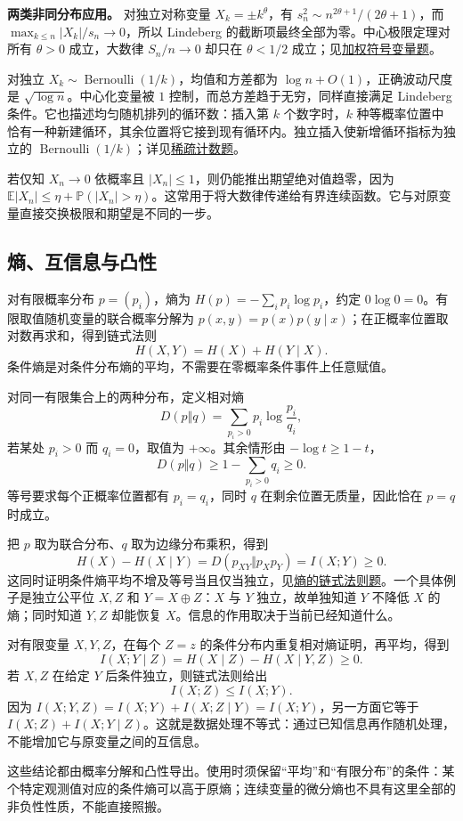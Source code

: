 \textbf{两类非同分布应用。} 对独立对称变量 $X_k=\pm k^\theta$，有 $s_n^2\sim n^{2\theta+1}/(2\theta+1)$，而 $\max_{k\le n}|X_k|/s_n\to0$，所以 Lindeberg 的截断项最终全部为零。中心极限定理对所有 $\theta>0$ 成立，大数律 $S_n/n\to0$ 却只在 $\theta<1/2$ 成立；见\hyperref[pr:fin10-hi:13]{加权符号变量题}。

对独立 $X_k\sim\operatorname{Bernoulli}(1/k)$，均值和方差都为 $\log n+O(1)$，正确波动尺度是 $\sqrt{\log n}$。中心化变量被 $1$ 控制，而总方差趋于无穷，同样直接满足 Lindeberg 条件。它也描述均匀随机排列的循环数：插入第 $k$ 个数字时，$k$ 种等概率位置中恰有一种新建循环，其余位置将它接到现有循环内。独立插入使新增循环指标为独立的 $\operatorname{Bernoulli}(1/k)$；详见\hyperref[pr:fin12-high:12]{稀疏计数题}。

若仅知 $X_n\to0$ 依概率且 $|X_n|\le1$，则仍能推出期望绝对值趋零，因为 $\mathbb E|X_n|\le\eta+\mathbb P(|X_n|>\eta)$。这常用于将大数律传递给有界连续函数。它与对原变量直接交换极限和期望是不同的一步。

\subsection{熵、互信息与凸性}

\label{app:probability-entropy}

对有限概率分布 $p=(p_i)$，熵为 $H(p)=-\sum_i p_i\log p_i$，约定 $0\log0=0$。有限取值随机变量的联合概率分解为 $p(x,y)=p(x)p(y\mid x)$；在正概率位置取对数再求和，得到链式法则
\[
H(X,Y)=H(X)+H(Y\mid X).
\]
条件熵是对条件分布熵的平均，不需要在零概率条件事件上任意赋值。

对同一有限集合上的两种分布，定义相对熵
\[
D(p\Vert q)=\sum_{p_i>0}p_i\log\frac{p_i}{q_i},
\]
若某处 $p_i>0$ 而 $q_i=0$，取值为 $+\infty$。其余情形由 $-\log t\ge1-t$，
\[
D(p\Vert q)\ge1-\sum_{p_i>0}q_i\ge0.
\]
等号要求每个正概率位置都有 $p_i=q_i$，同时 $q$ 在剩余位置无质量，因此恰在 $p=q$ 时成立。

把 $p$ 取为联合分布、$q$ 取为边缘分布乘积，得到
\[
H(X)-H(X\mid Y)
=D(p_{XY}\Vert p_Xp_Y)=I(X;Y)\ge0.
\]
这同时证明条件熵平均不增及等号当且仅当独立，见\hyperref[pr:fin17-high:12]{熵的链式法则题}。一个具体例子是独立公平位 $X,Z$ 和 $Y=X\mathbin{\oplus}Z$：$X$ 与 $Y$ 独立，故单独知道 $Y$ 不降低 $X$ 的熵；同时知道 $Y,Z$ 却能恢复 $X$。信息的作用取决于当前已经知道什么。

对有限变量 $X,Y,Z$，在每个 $Z=z$ 的条件分布内重复相对熵证明，再平均，得到
\[
I(X;Y\mid Z)=H(X\mid Z)-H(X\mid Y,Z)\ge0.
\]
若 $X,Z$ 在给定 $Y$ 后条件独立，则链式法则给出
\[
I(X;Z)\le I(X;Y).
\]
因为 $I(X;Y,Z)=I(X;Y)+I(X;Z\mid Y)=I(X;Y)$，另一方面它等于 $I(X;Z)+I(X;Y\mid Z)$。这就是数据处理不等式：通过已知信息再作随机处理，不能增加它与原变量之间的互信息。

这些结论都由概率分解和凸性导出。使用时须保留“平均”和“有限分布”的条件：某个特定观测值对应的条件熵可以高于原熵；连续变量的微分熵也不具有这里全部的非负性性质，不能直接照搬。






